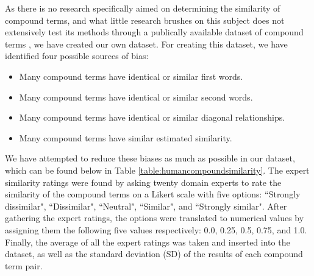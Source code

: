 \documentclass{article}
\begin{document}
As there is no research specifically aimed on determining the similarity of compound terms, and what little research brushes on this subject does not extensively test its methods through a publically available dataset of compound terms \cite{jeong2009functional}, we have created our own dataset. For creating this dataset, we have identified four possible sources of bias:
\begin{itemize}
	\item Many compound terms have identical or similar first words.
	\item Many compound terms have identical or similar second words.
	\item Many compound terms have identical or similar diagonal relationships.
	\item Many compound terms have similar estimated similarity.
\end{itemize}
We have attempted to reduce these biases as much as possible in our dataset, which can be found below in Table \ref{table:humancompoundsimilarity}. The expert similarity ratings were found by asking twenty domain experts to rate the similarity of the compound terms on a Likert scale with five options: ``Strongly dissimilar", ``Dissimilar", ``Neutral", ``Similar", and ``Strongly similar". After gathering the expert ratings, the options were translated to numerical values by assigning them the following five values respectively: 0.0, 0.25, 0.5, 0.75, and 1.0. Finally, the average of all the expert ratings was taken and inserted into the dataset, as well as the standard deviation (SD) of the results of each compound term pair.
\end{document}

